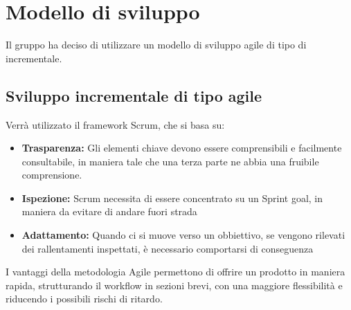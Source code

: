 \section{Modello di sviluppo}
Il gruppo ha deciso di utilizzare un modello di sviluppo agile di tipo di incrementale.
\subsection {Sviluppo incrementale di tipo agile}
Verrà utilizzato il framework Scrum, che si basa su:
\begin{itemize}
    \item \textbf{Trasparenza:} Gli elementi chiave devono essere comprensibili e facilmente consultabile, in maniera tale che una
                                terza parte ne abbia una fruibile comprensione.
    \item \textbf{Ispezione:} Scrum necessita di essere concentrato su un Sprint goal, in maniera da evitare di andare fuori strada
    \item \textbf{Adattamento:} Quando ci si muove verso un obbiettivo, se vengono rilevati dei rallentamenti inspettati, è necessario comportarsi di conseguenza
\end{itemize}
I vantaggi della metodologia Agile permettono di offrire un prodotto in maniera rapida, strutturando il workflow in sezioni brevi, con una maggiore flessibilità
e riducendo i possibili rischi di ritardo.
